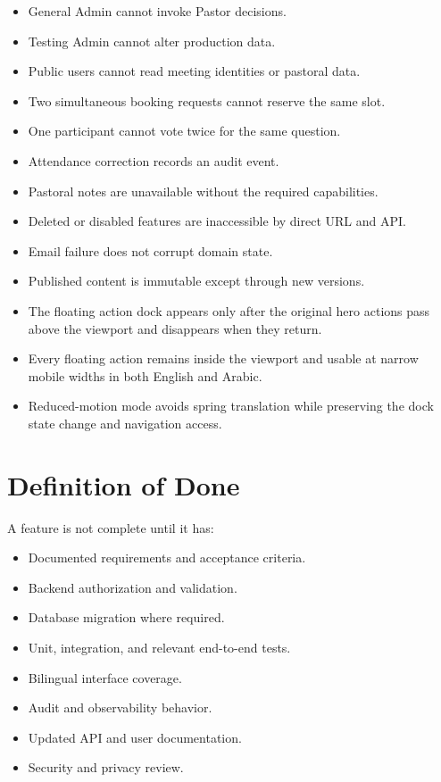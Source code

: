 \documentclass[11pt,a4paper,oneside]{report}
\begin{document}
\begin{itemize}
  \item General Admin cannot invoke Pastor decisions.
  \item Testing Admin cannot alter production data.
  \item Public users cannot read meeting identities or pastoral data.
  \item Two simultaneous booking requests cannot reserve the same slot.
  \item One participant cannot vote twice for the same question.
  \item Attendance correction records an audit event.
  \item Pastoral notes are unavailable without the required capabilities.
  \item Deleted or disabled features are inaccessible by direct URL and API.
  \item Email failure does not corrupt domain state.
  \item Published content is immutable except through new versions.
  \item The floating action dock appears only after the original hero actions pass above the viewport and disappears when they return.
  \item Every floating action remains inside the viewport and usable at narrow mobile widths in both English and Arabic.
  \item Reduced-motion mode avoids spring translation while preserving the dock state change and navigation access.
\end{itemize}

\section{Definition of Done}

A feature is not complete until it has:

\begin{itemize}
  \item Documented requirements and acceptance criteria.
  \item Backend authorization and validation.
  \item Database migration where required.
  \item Unit, integration, and relevant end-to-end tests.
  \item Bilingual interface coverage.
  \item Audit and observability behavior.
  \item Updated API and user documentation.
  \item Security and privacy review.
\end{itemize}
\end{document}
